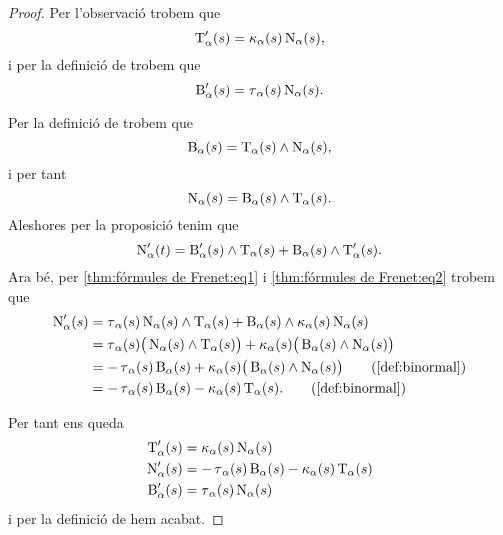 \documentclass[../../main.tex]{subfiles}
\begin{document}
    \begin{proof}
        Per l'observació  trobem que
        \begin{equation}
            \label{thm:fórmules de Frenet:eq1}
            \operatorname{T}_{\alpha}'(s)=\operatorname{\kappa}_{\alpha}(s)\operatorname{N}_{\alpha}(s),
        \end{equation}
        i per la definició de  trobem que
        \begin{equation}
            \label{thm:fórmules de Frenet:eq2}
            \operatorname{B}'_{\alpha}(s)=\operatorname{\tau}_{\alpha}(s)\operatorname{N}_{\alpha}(s).
        \end{equation}

        Per la definició de  trobem que
        \[
            \operatorname{B}_{\alpha}(s)=\operatorname{T}_{\alpha}(s)\mathbin{\wedge}\operatorname{N}_{\alpha}(s),
        \]
        i per tant %
        \[
            \operatorname{N}_{\alpha}(s)=\operatorname{B}_{\alpha}(s)\mathbin{\wedge}\operatorname{T}_{\alpha}(s).
        \]
        Aleshores per la proposició  tenim que
        \[
            \operatorname{N}'_{\alpha}(t)=\operatorname{B}'_{\alpha}(s)\mathbin{\wedge}\operatorname{T}_{\alpha}(s)+\operatorname{B}_{\alpha}(s)\mathbin{\wedge}\operatorname{T}'_{\alpha}(s).
        \]
        Ara bé, per \eqref{thm:fórmules de Frenet:eq1} i \eqref{thm:fórmules de Frenet:eq2} trobem que
        \begin{align*}
            \normal'_{\alpha}(s)&=\torsio_{\alpha}(s)\normal_{\alpha}(s)\prodvec\tangent_{\alpha}(s)+\binormal_{\alpha}(s)\prodvec\curvatura_{\alpha}(s)\normal_{\alpha}(s) \\
            &=\torsio_{\alpha}(s)\big(\normal_{\alpha}(s)\prodvec\tangent_{\alpha}(s)\big)+\curvatura_{\alpha}(s)\big(\binormal_{\alpha}(s)\prodvec\normal_{\alpha}(s)\big) \\ %
            &=-\torsio_{\alpha}(s)\binormal_{\alpha}(s)+\curvatura_{\alpha}(s)\big(\binormal_{\alpha}(s)\prodvec\normal_{\alpha}(s)\big) \tag{\ref{def:binormal}} \\
            &=-\torsio_{\alpha}(s)\binormal_{\alpha}(s)-\curvatura_{\alpha}(s)\tangent_{\alpha}(s).
            \tag{\ref{def:binormal}}
        \end{align*}

        Per tant ens queda
        \begin{align*}
            \operatorname{T}_{\alpha}'(s)&=\operatorname{\kappa}_{\alpha}(s)\operatorname{N}_{\alpha}(s) \\
            \operatorname{N}'_{\alpha}(s)&=-\operatorname{\tau}_{\alpha}(s)\operatorname{B}_{\alpha}(s)-\operatorname{\kappa}_{\alpha}(s)\operatorname{T}_{\alpha}(s) \\
            \operatorname{B}'_{\alpha}(s)&=\operatorname{\tau}_{\alpha}(s)\operatorname{N}_{\alpha}(s)
        \end{align*}
        i per la definició de  hem acabat.
    \end{proof}
\end{document}
